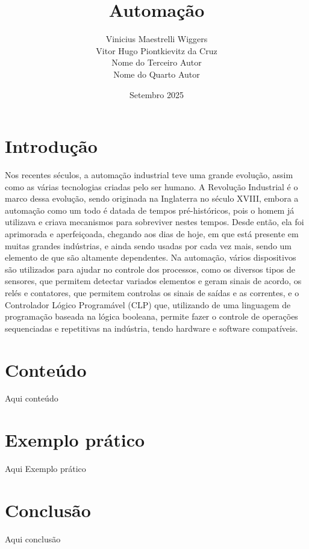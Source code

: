 \documentclass{article}
\title{Automação}
\author{%
	Vinicius Maestrelli Wiggers\\[0.5em]
	Vitor Hugo Piontkievitz da Cruz\\[0.5em]
	Nome do Terceiro Autor\\[0.5em]
	Nome do Quarto Autor
}
\date{Setembro 2025}
\begin{document}
\maketitle

\section{Introdução}
Nos recentes séculos, a automação industrial teve uma grande evolução, assim como as várias tecnologias criadas pelo ser humano. A Revolução Industrial é o marco dessa evolução, sendo originada na Inglaterra no século XVIII, embora a automação como um todo é datada de tempos pré-históricos, pois o homem já utilizava e criava mecanismos para sobreviver nestes tempos. Desde então, ela foi aprimorada e aperfeiçoada, chegando aos dias de hoje, em que está presente em muitas grandes indústrias, e ainda sendo usadas por cada vez mais, sendo um elemento de que são altamente dependentes. Na automação, vários dispositivos são utilizados para ajudar no controle dos processos, como os diversos tipos de sensores, que permitem detectar variados elementos e geram sinais de acordo, os relés e contatores, que permitem controlas os sinais de saídas e as correntes, e o Controlador Lógico Programável (CLP) que, utilizando de uma linguagem de programação baseada na lógica booleana, permite fazer o controle de operações sequenciadas e repetitivas na indústria, tendo hardware e software compatíveis.  

\section{Conteúdo}
Aqui conteúdo

\section{Exemplo prático}
Aqui Exemplo prático

\section{Conclusão}
Aqui conclusão
\end{document}
